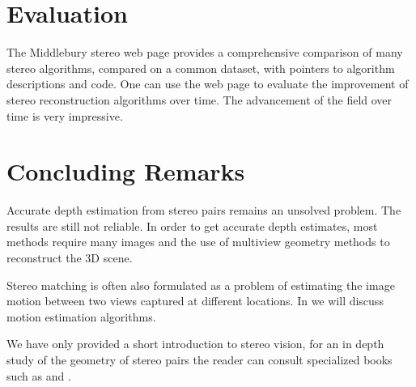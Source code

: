 














\section{Evaluation}

The Middlebury stereo web page \cite{Scharstein2002} provides a comprehensive comparison of many stereo algorithms, compared on a common dataset, with pointers to algorithm descriptions and code.  One can use the web page to evaluate the improvement of stereo reconstruction algorithms over time.  The advancement of the field over time is very impressive.


\section{Concluding Remarks}

Accurate depth estimation from stereo pairs remains an unsolved problem. The results are still not reliable. In order to get accurate depth estimates, most methods require many images and the use of multiview geometry methods to reconstruct the 3D scene. 

Stereo matching is often also formulated as a problem of estimating the image motion between two views captured at different locations. In \chap{\ref{chapter:motion_estimation}} we will discuss motion estimation algorithms.

We have only provided a short introduction to stereo vision, for an in depth study of the geometry of stereo pairs the reader can consult specialized books such as \cite{Hartley2004} and \cite{Faugeras93}.

